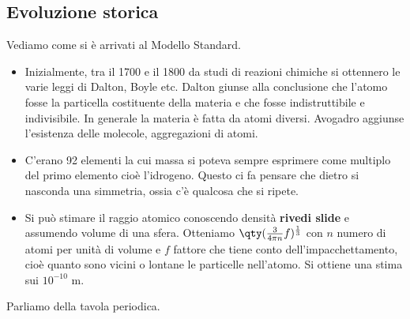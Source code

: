 \subsection{Evoluzione storica}
Vediamo come si è arrivati al Modello Standard.
\begin{itemize}
    \item Inizialmente, tra il 1700 e il 1800 da studi di reazioni chimiche si ottennero le varie leggi di Dalton, Boyle etc. Dalton giunse alla conclusione che l'atomo fosse la particella costituente della materia e che fosse indistruttibile e indivisibile. In generale la materia è fatta da atomi diversi. Avogadro aggiunse l'esistenza delle molecole, aggregazioni di atomi. 
    \item C'erano 92 elementi la cui massa si poteva sempre esprimere come multiplo del primo elemento cioè l'idrogeno. Questo ci fa pensare che dietro si nasconda una simmetria, ossia c'è qualcosa che si ripete.
    \item Si può stimare il raggio atomico conoscendo densità \textbf{rivedi slide} e assumendo volume di una sfera. Otteniamo $\qty(\frac{3}{4\pi n}f)^\frac13$ con $n$ numero di atomi per unità di volume e $f$ fattore che tiene conto dell'impacchettamento, cioè quanto sono vicini o lontane le particelle nell'atomo. Si ottiene una stima sui $10^{-10}$ m.
\end{itemize}
Parliamo della tavola periodica.
